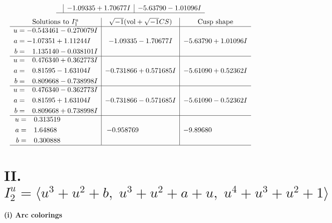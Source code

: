 \documentclass[1p]{elsarticle_modified}
\theoremstyle{definition}
\newcommand{\I}{\sqrt{-1}}
\begin{document}
$$\begin{array}{c|c|c}
 & -1.09335 + 1.70677 I & -5.63790 - 1.01096 I\\
 \hline 
 \end{array}$$\newpage$$\begin{array}{c|c|c}  
\text{Solutions to }I^u_{1}& \I (\text{vol} + \sqrt{-1}CS) & \text{Cusp shape}\\
 \hline 
\begin{aligned}
u &= -0.543461 - 0.270079 I \\
a &= -1.07351 + 1.11244 I \\
b &= \phantom{-}1.135140 - 0.038101 I\end{aligned}
 & -1.09335 - 1.70677 I & -5.63790 + 1.01096 I \\ \hline\begin{aligned}
u &= \phantom{-}0.476340 + 0.362773 I \\
a &= \phantom{-}0.81595 - 1.63104 I \\
b &= \phantom{-}0.809668 - 0.738998 I\end{aligned}
 & -0.731866 + 0.571685 I & -5.61090 + 0.52362 I \\ \hline\begin{aligned}
u &= \phantom{-}0.476340 - 0.362773 I \\
a &= \phantom{-}0.81595 + 1.63104 I \\
b &= \phantom{-}0.809668 + 0.738998 I\end{aligned}
 & -0.731866 - 0.571685 I & -5.61090 - 0.52362 I \\ \hline\begin{aligned}
u &= \phantom{-}0.313519\phantom{ +0.000000I} \\
a &= \phantom{-}1.64868\phantom{ +0.000000I} \\
b &= \phantom{-}0.300888\phantom{ +0.000000I}\end{aligned}
 & -0.958769\phantom{ +0.000000I} & -9.89680\phantom{ +0.000000I}\\
 \hline 
 \end{array}$$\newpage\newpage\renewcommand{\arraystretch}{1}
\centering \section*{II. $I^u_{2}= \langle u^3+u^2+b,\;u^3+u^2+a+u,\;u^4+u^3+u^2+1 \rangle$}
\flushleft \textbf{(i) Arc colorings}\\
\end{document}
